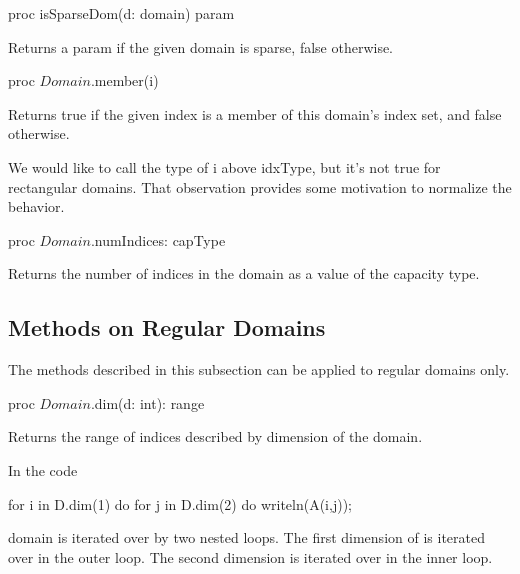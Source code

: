 \begin{protohead}
proc isSparseDom(d: domain) param
\end{protohead}
\begin{protobody}
Returns a param  if the given domain is sparse, false otherwise.
\end{protobody}

\begin{protohead}
proc $Domain$.member(i)
\end{protohead}
\begin{protobody}
Returns true if the given index  is a member of this domain's index set,
and false otherwise.
\end{protobody}

\begin{openissue}
We would like to call the type of i above idxType, but it's not true
for rectangular domains.  That observation provides some motivation to normalize
the behavior.
\end{openissue}

\begin{protohead}
proc $Domain$.numIndices: capType
\end{protohead}
\begin{protobody}
Returns the number of indices in the domain as a value of the capacity type.
\end{protobody}


\subsection{Methods on Regular Domains}

The methods described in this subsection can be applied to regular domains only.

\begin{protohead}
proc $Domain$.dim(d: int): range
\end{protohead}
\begin{protobody}
Returns the range of indices described by dimension  of the
domain.
\end{protobody}

\begin{example}
In the code
\begin{chapel}
for i in D.dim(1) do
  for j in D.dim(2) do
    writeln(A(i,j));
\end{chapel}
domain  is iterated over by two nested loops.  The first
dimension of  is iterated over in the outer loop.  The second
dimension is iterated over in the inner loop.
\end{example}

